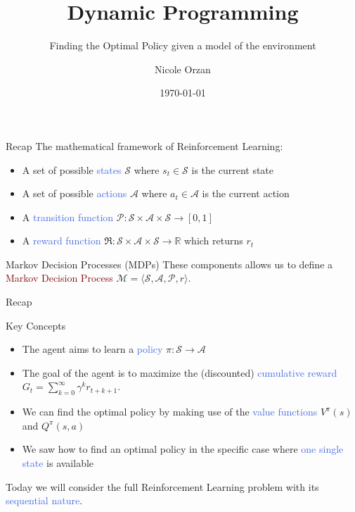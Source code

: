 \documentclass{beamer}
\title{Dynamic Programming}
\subtitle{Finding the Optimal Policy given a model of the environment}
\author{Nicole Orzan}
\date{\today}
\begin{document}
\frame{\titlepage} 


\begin{frame}{Recap}
	The mathematical framework of Reinforcement Learning:
	\begin{itemize}
		\item A set of possible \textcolor{RoyalBlue}{states} $\mathcal{S}$ where $s_t\in\mathcal{S}$ is the current state
		\item A set of possible \textcolor{RoyalBlue}{actions} $\mathcal{A}$ where $a_t\in\mathcal{A}$ is the current action
		\item A \textcolor{RoyalBlue}{transition function} $\mathcal{P}:\mathcal{S}\times\mathcal{A}\times\mathcal{S}\rightarrow[0,1]$
		\item A \textcolor{RoyalBlue}{reward function} $\Re:\mathcal{S}\times\mathcal{A}\times\mathcal{S}\rightarrow \mathbb{R}$ which returns $r_t$
	\end{itemize}

	\begin{block}{Markov Decision Processes (MDPs)}
		These components allows us to define a \textcolor{Maroon}{Markov Decision Process} 
		\centering $\mathcal{M}=\langle \mathcal{S},\mathcal{A},\mathcal{P},r\rangle$.
	\end{block}

\end{frame}


\begin{frame}{Recap}

\begin{block}{Key Concepts}
\begin{itemize}
	\item The agent aims to learn a \textcolor{RoyalBlue}{policy} $\pi: \mathcal{S}\rightarrow \mathcal{A}$
	\item The goal of the agent is to maximize the (discounted) \textcolor{RoyalBlue}{cumulative reward} $G_t = \sum_{k=0}^{\infty}\gamma^{k} r_{t+k+1}$.
	\item We can find the optimal policy by making use of the \textcolor{RoyalBlue}{value functions} $V^\pi(s)$ and $Q^\pi(s,a)$ 
	\item We saw how to find an optimal policy in the specific case where \textcolor{RoyalBlue}{one single state} is available
\end{itemize}
\end{block}

\vspace{2mm}

	Today we will consider the full Reinforcement Learning problem with its \textcolor{RoyalBlue}{sequential nature}.
	
\end{frame}
\end{document}
